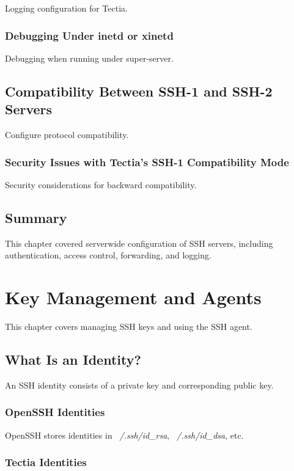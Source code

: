 \documentclass[12pt]{book}
\begin{document}
Logging configuration for Tectia.

\subsection{Debugging Under inetd or xinetd}

Debugging when running under super-server.

\section{Compatibility Between SSH-1 and SSH-2 Servers}

Configure protocol compatibility.

\subsection{Security Issues with Tectia's SSH-1 Compatibility Mode}

Security considerations for backward compatibility.

\section{Summary}

This chapter covered serverwide configuration of SSH servers, including authentication, access control, forwarding, and logging.

\chapter{Key Management and Agents}

This chapter covers managing SSH keys and using the SSH agent.

\section{What Is an Identity?}

An SSH identity consists of a private key and corresponding public key.

\subsection{OpenSSH Identities}

OpenSSH stores identities in \textit{~/.ssh/id\_rsa}, \textit{~/.ssh/id\_dsa}, etc.

\subsection{Tectia Identities}
\end{document}
